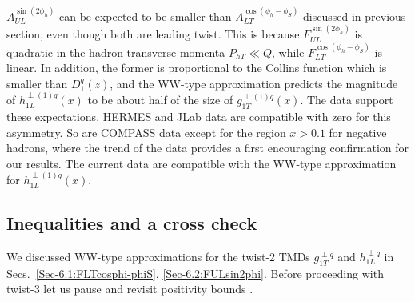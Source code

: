 \documentclass[a4paper,11pt]{article}
\begin{document}
$A_{UL}^{\sin(2\phi_h)}$  can be expected to be smaller than 
$A_{LT}^{\cos(\phi_h -\phi_S)}$ discussed in previous section,
even though both are leading twist. This is because 
$F_{UL}^{\sin(2\phi_h)}$ is quadratic in the hadron transverse 
momenta $P_{hT}\ll Q$, while $F_{LT}^{\cos(\phi_h -\phi_S)}$ is linear. 
In addition, the former is proportional to the Collins function 
which is smaller than $D_1^q(z)$, and the WW-type approximation 
predicts the magnitude of $h_{1L}^{\perp(1)q}(x)$ to be about half 
of the size of $g_{1T}^{\perp(1)q}(x)$.
The data support these expectations. HERMES and JLab data are compatible
with zero for this asymmetry. So are COMPASS data except for the region
$x>0.1$ for negative hadrons, where the trend of the data provides a first 
encouraging confirmation for our results. The current data are compatible
with the WW-type approximation for $h_{1L}^{\perp(1)q}(x)$. 




\newpage

\subsection{Inequalities and a cross check}

We discussed WW-type approximations for the twist-2 TMDs
$g^{\perp q}_{1T}$ and $h^{\perp q}_{1L}$ 
in Secs.~\ref{Sec-6.1:FLTcosphi-phiS}, \ref{Sec-6.2:FULsin2phi}.
Before proceeding with twist-3 let us pause and revisit positivity 
bounds \cite{Bacchetta:1999kz}. %
\end{document}
